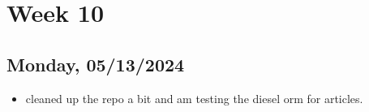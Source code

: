 \newpage
\section{Week 10}
\subsection*{Monday, 05/13/2024}
\begin{itemize}
    \item cleaned up the repo a bit and am testing the diesel orm for articles.
\end{itemize}
